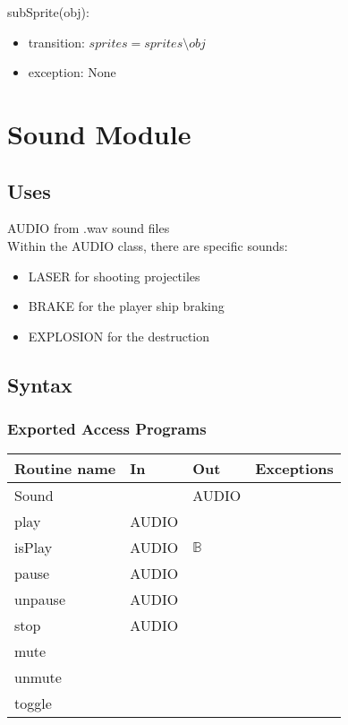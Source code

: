 \documentclass[12pt]{article}
\begin{document}
subSprite(obj):
\begin{itemize}
    \item transition: $ sprites = sprites \setminus obj $
    \item exception: None
\end{itemize}

\newpage

\section*{Sound Module}

\subsection*{Uses}

AUDIO from .wav sound files\\
Within the AUDIO class, there are specific sounds:\\
\begin{itemize}
  \item LASER for shooting projectiles\\
  \item BRAKE for the player ship braking\\
  \item EXPLOSION for the destruction\\
\end{itemize}

\subsection*{Syntax}

\subsubsection*{Exported Access Programs}

\begin{tabular}{| l | l | l | l |}
    \hline
    \textbf{Routine name} & \textbf{In} & \textbf{Out} & \textbf{Exceptions}\\
    \hline
    Sound & ~ & AUDIO & ~\\
    \hline
    play & AUDIO & ~ & ~\\
    \hline
    isPlay & AUDIO & $\mathbb{B}$ & ~\\
    \hline
    pause & AUDIO & ~ & ~\\
    \hline
    unpause & AUDIO & ~ & ~\\
    \hline
    stop & AUDIO & ~ & ~\\
    \hline
    mute & ~ & ~ & ~\\
    \hline
    unmute & ~ & ~ & ~\\
    \hline
    toggle & ~ & ~ & ~\\
    \hline
\end{tabular}
\end{document}
